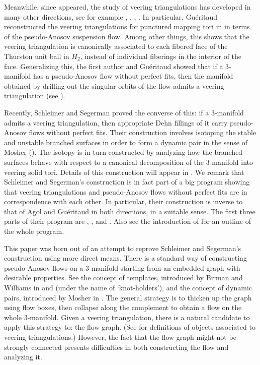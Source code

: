 \documentclass[12pt]{amsart}
\theoremstyle{definition}
\numberwithin{equation}{section}
\begin{document}
Meanwhile, since \cite{Ago11} appeared, the study of veering triangulations has developed in many other directions, see for example \cite{Gue16}, \cite{HIS16}, \cite{HRST11}, \cite{Lan18}. In particular, Gu\'eritaud reconstructed the veering triangulations for punctured mapping tori in \cite{Gue16} in terms of the pseudo-Anosov suspension flow. Among other things, this shows that the veering triangulation is canonically associated to each fibered face of the Thurston unit ball in $H_2$, instead of individual fiberings in the interior of the face. Generalizing this, the first author and Gu\'{e}ritaud showed that if a 3-manifold has a pseudo-Anosov flow without perfect fits, then the manifold obtained by drilling out the singular orbits of the flow admits a veering triangulation (see \cite{LMT21}). 

Recently, Schleimer and Segerman proved the converse of this: if a 3-manifold admits a veering triangulation, then appropriate Dehn fillings of it carry pseudo-Anosov flows without perfect fits. Their construction involves isotoping the stable and unstable branched surfaces in order to form a dynamic pair in the sense of Mosher (\cite{Mos96}). The isotopy is in turn constructed by analyzing how the branched surfaces behave with respect to a canonical decomposition of the 3-manifold into veering solid tori. Details of this construction will appear in \cite{SS22}. We remark that Schleimer and Segerman's construction is in fact part of a big program showing that veering triangulations and pseudo-Anosov flows without perfect fits are in correspondence with each other. In particular, their construction is inverse to that of Agol and Gu\'eritaud in both directions, in a suitable sense. The first three parts of their program are \cite{SS18}, \cite{SS21}, and \cite{SS19}. Also see the introduction of \cite{SS19} for an outline of the whole program. 

This paper was born out of an attempt to reprove Schleimer and Segerman's construction using more direct means. There is a standard way of constructing pseudo-Anosov flows on a 3-manifold starting from an embedded graph with desirable properties. See the concept of templates, introduced by Birman and Williams in \cite{BW83a} and \cite{BW83b} (under the name of `knot-holders'), and the concept of dynamic pairs, introduced by Mosher in \cite{Mos96}. The general strategy is to thicken up the graph using flow boxes, then collapse along the complement to obtain a flow on the whole 3-manifold. Given a veering triangulation, there is a natural candidate to apply this strategy to: the flow graph. (See  for definitions of objects associated to veering triangulations.) However, the fact that the flow graph might not be strongly connected presents difficulties in both constructing the flow and analyzing it.
\end{document}
